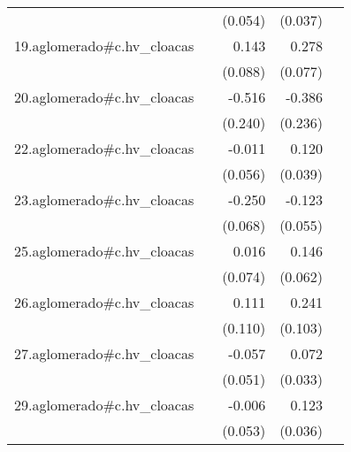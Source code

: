 {\begin{longtable}{l*{4}{D{.}{.}{-1}}}
            &                     &     (0.054)         &     (0.037)         &                     \\
\addlinespace
19.aglomerado#c.hv\_cloacas&                     &       0.143         &       0.278\sym{***}&                     \\
            &                     &     (0.088)         &     (0.077)         &                     \\
\addlinespace
20.aglomerado#c.hv\_cloacas&                     &      -0.516\sym{*}  &      -0.386         &                     \\
            &                     &     (0.240)         &     (0.236)         &                     \\
\addlinespace
22.aglomerado#c.hv\_cloacas&                     &      -0.011         &       0.120\sym{**} &                     \\
            &                     &     (0.056)         &     (0.039)         &                     \\
\addlinespace
23.aglomerado#c.hv\_cloacas&                     &      -0.250\sym{***}&      -0.123\sym{*}  &                     \\
            &                     &     (0.068)         &     (0.055)         &                     \\
\addlinespace
25.aglomerado#c.hv\_cloacas&                     &       0.016         &       0.146\sym{*}  &                     \\
            &                     &     (0.074)         &     (0.062)         &                     \\
\addlinespace
26.aglomerado#c.hv\_cloacas&                     &       0.111         &       0.241\sym{*}  &                     \\
            &                     &     (0.110)         &     (0.103)         &                     \\
\addlinespace
27.aglomerado#c.hv\_cloacas&                     &      -0.057         &       0.072\sym{*}  &                     \\
            &                     &     (0.051)         &     (0.033)         &                     \\
\addlinespace
29.aglomerado#c.hv\_cloacas&                     &      -0.006         &       0.123\sym{***}&                     \\
            &                     &     (0.053)         &     (0.036)         &                     \\

\end{longtable}}
